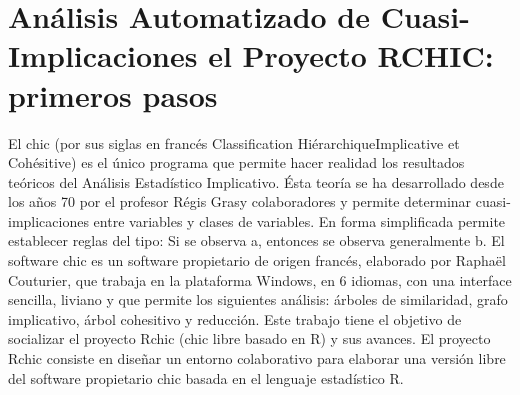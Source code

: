 \chapter{Análisis Automatizado de Cuasi-Implicaciones el Proyecto RCHIC: primeros pasos}




El chic (por sus siglas en francés Classification HiérarchiqueImplicative et Cohésitive) es el único programa que permite hacer realidad los resultados teóricos del Análisis Estadístico Implicativo. Ésta teoría se ha desarrollado desde los años 70 por el profesor Régis Grasy colaboradores y permite determinar cuasi-implicaciones entre variables y clases de variables. En forma simplificada permite establecer reglas del tipo: Si se observa a, entonces se observa generalmente b. El software chic es un software propietario de origen francés, elaborado por Raphaël Couturier, que trabaja en la plataforma Windows, en 6 idiomas, con una interface sencilla, liviano y que permite los siguientes análisis: árboles de similaridad, grafo implicativo, árbol cohesitivo y reducción. Este trabajo tiene el objetivo de socializar el proyecto Rchic (chic libre basado en R) y sus avances. El proyecto Rchic consiste en diseñar un entorno colaborativo para elaborar una versión libre del software propietario chic basada en el lenguaje estadístico R.

%

%

